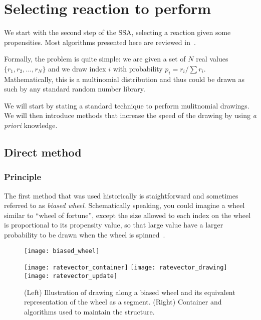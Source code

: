 \section {Selecting reaction to perform}
\label{sec:reaction_selection}

We start with the second step of the SSA, selecting a reaction given some propensities. Most algorithms presented here are reviewed in~\citet{gillespie_perspective:_2013}.

Formally, the problem is quite simple: we are given a set of $N$ real values $\{ r_1, r_2, ..., r_N \}$ and we draw index $i$ with probability $p_i = r_i / \sum r_i$. Mathematically, this is a multinomial distribution and thus could be drawn as such by any standard random number library.

We will start by stating a standard technique to perform mulitnomial drawings. We will then introduce methods that increase the speed of the drawing by using \textit {a priori} knowledge.

\subsection {Direct method}

\subsubsection {Principle}

The first method that was used historically is staightforward and sometimes referred to as \textit {biased wheel}. Schematically speaking, you could imagine a wheel similar to ``wheel of fortune'', except the size allowed to each index on the wheel is proportional to its propensity value, so that large value have a larger probability to be drawn when the wheel is spinned~.

\begin{figure}[!h]
  \centering
  \begin{minipage}{\textwidth}
    \begin{minipage}{0.5\textwidth}
      \texttt{[image: biased\_wheel]}
    \end{minipage}
    \begin{minipage}{0.5\textwidth}
      \texttt{[image: ratevector\_container]}
      \texttt{[image: ratevector\_drawing]}
      \texttt{[image: ratevector\_update]}
    \end{minipage}
  \end{minipage}
  \caption{(Left) Illustration of drawing along a biased wheel and its equivalent representation of the wheel as a segment. (Right) Container and algorithms used to maintain the structure.}
  \label{fig:biased_wheel}
\end {figure}

